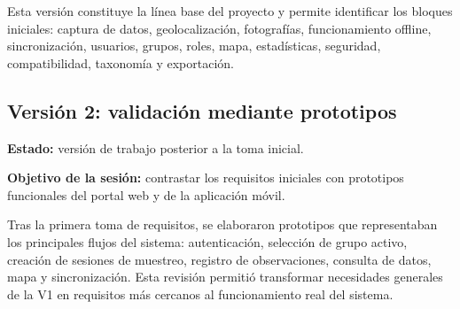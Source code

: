 Esta versión constituye la línea base del proyecto y permite identificar los
bloques iniciales: captura de datos, geolocalización, fotografías, funcionamiento
offline, sincronización, usuarios, grupos, roles, mapa, estadísticas, seguridad,
compatibilidad, taxonomía y exportación.

\subsection{Versión 2: validación mediante prototipos}

\textbf{Estado:} versión de trabajo posterior a la toma inicial.

\textbf{Objetivo de la sesión:} contrastar los requisitos iniciales con prototipos
funcionales del portal web y de la aplicación móvil.

Tras la primera toma de requisitos, se elaboraron prototipos que representaban los
principales flujos del sistema: autenticación, selección de grupo activo, creación
de sesiones de muestreo, registro de observaciones, consulta de datos, mapa y
sincronización. Esta revisión permitió transformar necesidades generales de la V1
en requisitos más cercanos al funcionamiento real del sistema.

